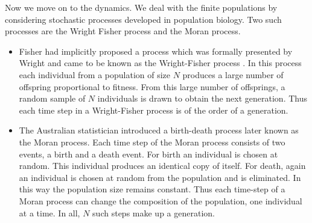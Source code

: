\documentclass[oneside,11pt,a4paper]{book}
\begin{document}
Now we move on to the dynamics.
We deal with the finite populations by considering stochastic processes developed in population biology.
Two such processes are the Wright Fisher process and the Moran process.
\begin{itemize}
\item Fisher had implicitly proposed a process which was formally presented by Wright and came to be known as the Wright-Fisher process \citep{fisher:1930fi,wright:1931ge}.
In this process each individual from a population of size $N$ produces a large number of offspring proportional to fitness.
From this large number of offsprings, a random sample of $N$ individuals is drawn to obtain the next generation.
Thus each time step in a Wright-Fisher process is of the order of a generation.
\item The Australian statistician \citet{moran:1962ef} introduced a birth-death process later known as the Moran process.
Each time step of the Moran process consists of two events, a birth and a death event.
For birth an individual is chosen at random.
This individual produces an identical copy of itself.
For death, again an individual is chosen at random from the population and is eliminated.
In this way the population size remains constant.
Thus each time-step of a Moran process can change the composition of the population, one individual at a time.
In all, $N$ such steps make up a generation.
\end{itemize}
\end{document}
